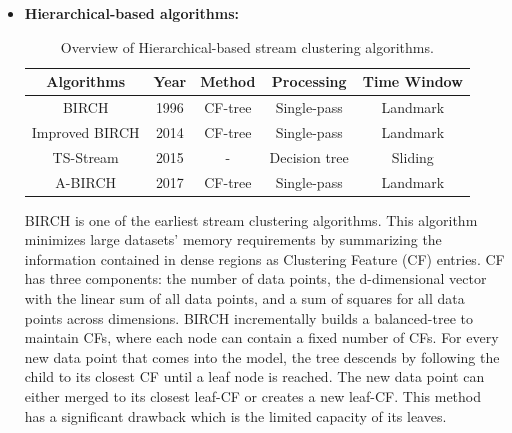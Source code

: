 \documentclass[../UNBThesis2.tex]{subfiles}
\begin{document}
\begin{itemize}







\item\textbf{Hierarchical-based algorithms:}

\begin{table}[h]
    \centering
    \caption{Overview of Hierarchical-based stream clustering algorithms. }
    \label{hirarcha}
    \small
    \begin{tabular}{c c c c c}
    \hline
      \textbf{Algorithms} & \textbf{Year} & \textbf{ Method } & \textbf{Processing} & \textbf{ Time Window}  \\
     \hline \midrule

      BIRCH             &    1996        &     CF-tree  &  Single-pass       & Landmark \\
     \hline
     Improved BIRCH     &    2014        &    CF-tree   &    Single-pass     & Landmark \\
      \hline
      TS-Stream         &     2015       &    -      &     Decision tree  & Sliding  \\
    \hline 
      A-BIRCH           &    2017        &   CF-tree    &   Single-pass      & Landmark\\
\bottomrule
    \end{tabular}
\end{table}

BIRCH \cite{zhang1996birch} is one of the earliest stream clustering algorithms. This algorithm minimizes large datasets' memory requirements by summarizing the information contained in dense regions as Clustering Feature (CF) entries. CF has three components: the number of data points, the d-dimensional vector with the linear sum of all data points, and a sum of squares for all data points across dimensions. BIRCH incrementally builds a balanced-tree to maintain CFs, where each node can contain a fixed number of CFs. 
For every new data point that comes into the model, the tree descends by following the child to its closest CF until a leaf node is reached. The new data point can either merged to its closest leaf-CF or creates a new leaf-CF. This method has a significant drawback which is the limited capacity of its leaves.


\end{itemize}
\end{document}
